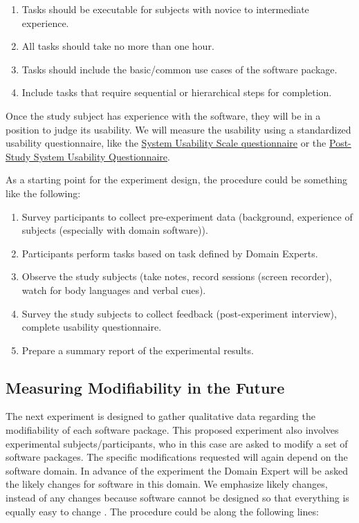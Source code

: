 \documentclass[letterpaper,cleveref]{lipics-v2019}
\begin{document}
\begin {enumerate}
\item Tasks should be executable for subjects with novice to intermediate
experience.
\item All tasks should take no more than one hour.
\item Tasks should include the basic/common use cases of the software package.
\item Include tasks that require sequential or hierarchical steps for
completion.
\end {enumerate}

Once the study subject has experience with the software, they will be in a
position to judge its usability.  We will measure the usability using a
standardized usability questionnaire, like the
\href{https://www.usabilitest.com/sus-pdf-generator} {System Usability Scale
questionnaire} or the
\href{https://uiuxtrend.com/pssuq-post-study-system-usability-questionnaire/}
{Post-Study System Usability Questionnaire}.

As a starting point for the experiment design, the procedure could be something
like the following:

\begin {enumerate}
\item Survey participants to collect pre-experiment data (background, experience
of subjects (especially with domain software)).
\item Participants perform tasks based on task defined by Domain Experts.
\item Observe the study subjects (take notes, record sessions (screen
recorder), watch for body languages and verbal cues).
\item Survey the study subjects to collect feedback (post-experiment interview),
complete usability questionnaire.
\item Prepare a summary report of the experimental results.
\end {enumerate}

\subsection{Measuring Modifiability in the Future}

The next experiment is designed to gather qualitative data regarding the
modifiability of each software package. This proposed experiment also involves
experimental subjects/participants, who in this case are asked to modify a set
of software packages.  The specific modifications requested will again depend on
the software domain.  In advance of the experiment the Domain Expert will be
asked the likely changes for software in this domain.  We emphasize likely
changes, instead of any changes because software cannot be designed so that
everything is equally easy to change \citep{parnas1986rational}.  The procedure
could be along the following lines:
\end{document}
